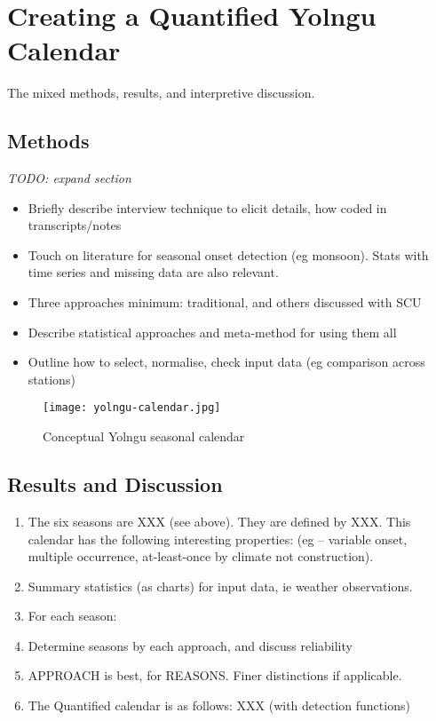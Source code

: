 \chapter{Creating a Quantified Yolngu Calendar}
The mixed methods, results, and interpretive discussion.

\section{Methods}

\emph{TODO:  expand section}
\begin{itemize}
\item Briefly describe interview technique to elicit details, how coded in transcripts/notes
\item Touch on literature for seasonal onset detection (eg monsoon).
        Stats with time series and missing data are also relevant.
\item Three approaches minimum:  traditional, and others discussed with SCU
\item Describe statistical approaches and meta-method for using them all
\item Outline how to select, normalise, check input data (eg comparison across stations)
\end{itemize}

\begin{figure}[h]
    \centering
    \texttt{[image: yolngu-calendar.jpg]}
    \caption{Conceptual Yolngu seasonal calendar \citep{davis1989}}
    \label{fig:yolngu-seasons}
\end{figure}

\section{Results and Discussion}

\begin{enumerate}
\item The six seasons are XXX (see above).  They are defined by XXX.
        This calendar has the following interesting properties:
        (eg – variable onset, multiple occurrence, at-least-once by climate not construction).
\item Summary statistics (as charts) for input data, ie weather observations.
\item For each season:
\item Determine seasons by each approach, and discuss reliability
\item APPROACH is best, for REASONS.  Finer distinctions if applicable.
\item The Quantified calendar is as follows:  XXX (with detection functions)
\end{enumerate}

